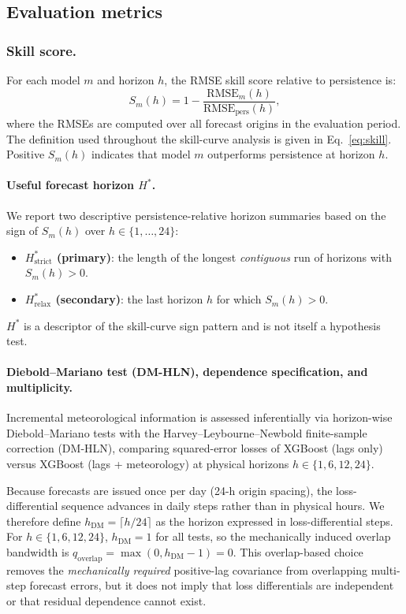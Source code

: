 \documentclass[pdflatex,sn-basic,iicol]{sn-jnl}
\begin{document}
\subsection{Evaluation metrics}

\subsubsection{Skill score.}
For each model $m$ and horizon $h$, the RMSE skill score relative to
persistence is:
\begin{equation}
  S_m(h) = 1 - \frac{\mathrm{RMSE}_m(h)}{\mathrm{RMSE}_{\text{pers}}(h)},
  \label{eq:skill}
\end{equation}
where the RMSEs are computed over all forecast origins in the evaluation period.
The definition used throughout the skill-curve analysis is given in
Eq.~\ref{eq:skill}.
Positive $S_m(h)$ indicates that model $m$ outperforms persistence at horizon
$h$.

\paragraph{Useful forecast horizon \texorpdfstring{$H^*$}{H*}.}
We report two descriptive persistence-relative horizon summaries based on the sign of
$S_m(h)$ over $h\in\{1,\ldots,24\}$:
\begin{itemize}
  \item \textbf{$H^*_{\text{strict}}$ (primary)}: the length of the longest \emph{contiguous} run of horizons with $S_m(h)>0$.
  \item \textbf{$H^*_{\text{relax}}$ (secondary)}: the last horizon $h$ for which $S_m(h)>0$.
\end{itemize}
$H^*$ is a descriptor of the skill-curve sign pattern and is not itself a hypothesis
test.

\paragraph{Diebold--Mariano test (DM-HLN), dependence specification, and multiplicity.}
Incremental meteorological information is assessed inferentially via horizon-wise
Diebold--Mariano tests \citep{Diebold1995} with the Harvey--Leybourne--Newbold
finite-sample correction \citep{Harvey1997} (DM-HLN), comparing squared-error losses of
XGBoost (lags only) versus XGBoost (lags + meteorology) at physical horizons
$h\in\{1,6,12,24\}$.

Because forecasts are issued once per day (24-h origin spacing), the loss-differential
sequence advances in daily steps rather than in physical hours.  We therefore define
$h_{\text{DM}}=\lceil h/24\rceil$ as the horizon expressed in loss-differential steps.
For $h\in\{1,6,12,24\}$, $h_{\text{DM}}=1$ for all tests, so the mechanically induced
overlap bandwidth is $q_{\text{overlap}}=\max(0,h_{\text{DM}}-1)=0$.  This
overlap-based choice removes the \emph{mechanically required} positive-lag covariance
from overlapping multi-step forecast errors, but it does not imply that loss
differentials are independent or that residual dependence cannot exist.
\end{document}
